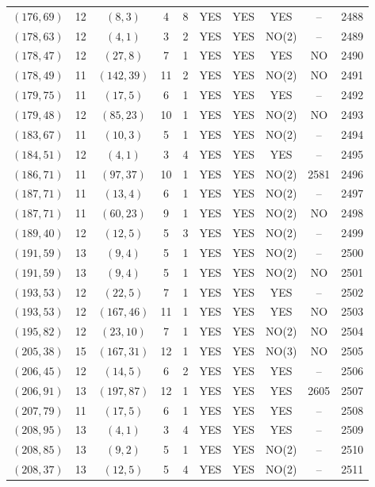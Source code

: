 \begin{longtable}{|c|c|c|c|c|c|c|c|c|c|}
$(176, 69)$ & 12 & $(8, 3)$ & 4 & 8 & YES & YES & YES & -- & 2488\\
$(178, 63)$ & 12 & $(4, 1)$ & 3 & 2 & YES & YES & NO(2) & -- & 2489\\
$(178, 47)$ & 12 & $(27, 8)$ & 7 & 1 & YES & YES & YES & NO & 2490\\
$(178, 49)$ & 11 & $(142, 39)$ & 11 & 2 & YES & YES & NO(2) & NO & 2491\\
$(179, 75)$ & 11 & $(17, 5)$ & 6 & 1 & YES & YES & YES & -- & 2492\\
$(179, 48)$ & 12 & $(85, 23)$ & 10 & 1 & YES & YES & NO(2) & NO & 2493\\
$(183, 67)$ & 11 & $(10, 3)$ & 5 & 1 & YES & YES & NO(2) & -- & 2494\\
$(184, 51)$ & 12 & $(4, 1)$ & 3 & 4 & YES & YES & YES & -- & 2495\\
$(186, 71)$ & 11 & $(97, 37)$ & 10 & 1 & YES & YES & NO(2) & 2581 & 2496\\
$(187, 71)$ & 11 & $(13, 4)$ & 6 & 1 & YES & YES & NO(2) & -- & 2497\\
$(187, 71)$ & 11 & $(60, 23)$ & 9 & 1 & YES & YES & NO(2) & NO & 2498\\
$(189, 40)$ & 12 & $(12, 5)$ & 5 & 3 & YES & YES & NO(2) & -- & 2499\\
$(191, 59)$ & 13 & $(9, 4)$ & 5 & 1 & YES & YES & NO(2) & -- & 2500\\
$(191, 59)$ & 13 & $(9, 4)$ & 5 & 1 & YES & YES & NO(2) & NO & 2501\\
$(193, 53)$ & 12 & $(22, 5)$ & 7 & 1 & YES & YES & YES & -- & 2502\\
$(193, 53)$ & 12 & $(167, 46)$ & 11 & 1 & YES & YES & YES & NO & 2503\\
$(195, 82)$ & 12 & $(23, 10)$ & 7 & 1 & YES & YES & NO(2) & NO & 2504\\
$(205, 38)$ & 15 & $(167, 31)$ & 12 & 1 & YES & YES & NO(3) & NO & 2505\\
$(206, 45)$ & 12 & $(14, 5)$ & 6 & 2 & YES & YES & YES & -- & 2506\\
$(206, 91)$ & 13 & $(197, 87)$ & 12 & 1 & YES & YES & YES & 2605 & 2507\\
$(207, 79)$ & 11 & $(17, 5)$ & 6 & 1 & YES & YES & YES & -- & 2508\\
$(208, 95)$ & 13 & $(4, 1)$ & 3 & 4 & YES & YES & YES & -- & 2509\\
$(208, 85)$ & 13 & $(9, 2)$ & 5 & 1 & YES & YES & NO(2) & -- & 2510\\
$(208, 37)$ & 13 & $(12, 5)$ & 5 & 4 & YES & YES & NO(2) & -- & 2511\\

\end{longtable}
